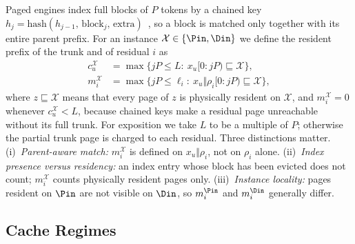 Paged engines index full blocks of $P$ tokens by a chained key $h_j=\mathrm{hash}(h_{j-1},\,\text{block}_j,\,\text{extra})$~\cite{vllm,sglang}, so a block is matched only together with its entire parent prefix.
For an instance $\mathcal{X}\in\{\Pin,\Din\}$ we define the resident prefix of the trunk and of residual $i$ as
\begin{align}
c_u^{\mathcal{X}} &= \max\{jP\le L:\ x_u[0{:}jP)\sqsubseteq\mathcal{X}\}, \label{eq:mi}\\
m_i^{\mathcal{X}} &= \max\{jP\le \ell_i:\ x_u\Vert\rho_i[0{:}jP)\sqsubseteq\mathcal{X}\}, \nonumber
\end{align}
where $z\sqsubseteq\mathcal{X}$ means that every page of $z$ is physically resident on $\mathcal{X}$,
and $m_i^{\mathcal{X}}{=}0$ whenever $c_u^{\mathcal{X}}{<}L$, because chained keys make a residual page unreachable without its full trunk.
For exposition we take $L$ to be a multiple of $P$; otherwise the partial trunk page is charged to each residual.
Three distinctions matter.
(i)~\emph{Parent-aware match:} $m_i^{\mathcal{X}}$ is defined on $x_u\Vert\rho_i$, not on $\rho_i$ alone.
(ii)~\emph{Index presence versus residency:} an index entry whose block has been evicted does not count; $m_i^{\mathcal{X}}$ counts physically resident pages only.
(iii)~\emph{Instance locality:} pages resident on $\Pin$ are not visible on $\Din$, so $m_i^{\Pin}$ and $m_i^{\Din}$ generally differ.

\subsection{Cache Regimes}
\label{sec:regimes}

